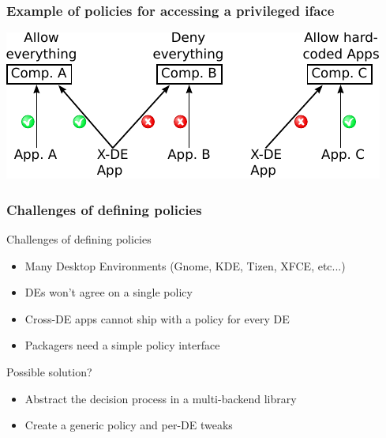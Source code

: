 \begin{frame}
\frametitle{Example of policies for accessing a privileged iface}
	\begin{center}
		\includegraphics[width=\linewidth]{figures/libwsm_without.pdf}
	\end{center}
\end{frame}

\begin{frame}
\frametitle{Challenges of defining policies}
	\begin{block}{Challenges of defining policies}
		\begin{itemize}
			\item Many Desktop Environments (Gnome, KDE, Tizen, XFCE, etc...)
			\item DEs won't agree on a single policy
			\item Cross-DE apps cannot ship with a policy for every DE
			\item Packagers need a simple policy interface
		\end{itemize}
	\end{block}

	\begin{block}{Possible solution?}
		\begin{itemize}
			\item Abstract the decision process in a multi-backend library
			\item Create a generic policy and per-DE tweaks
		\end{itemize}
	\end{block}
\end{frame}


